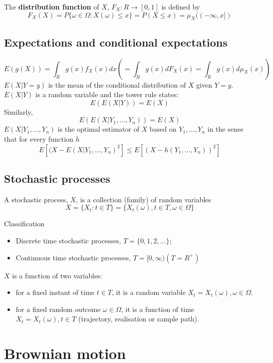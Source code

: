 \documentclass[11pt,a4paper]{book}
\theoremstyle{definition}\newtheorem{definition}{Definition}
\theoremstyle{definition}\newtheorem{fact}{Fact}
\theoremstyle{definition}\newtheorem{remark}{Remark}
\theoremstyle{definition}\newtheorem{ex}{Ex.}
\theoremstyle{definition}\newtheorem{project}{Project}
\theoremstyle{definition}\newtheorem{problem}{Problem}
\theoremstyle{definition}\newtheorem{example}{Example}
\numberwithin{theorem}{section}
\numberwithin{corollary}{chapter}
\numberwithin{assumption}{chapter}
\numberwithin{definition}{chapter}
\numberwithin{prop}{chapter}
\numberwithin{notation}{chapter}
\numberwithin{problem}{chapter}
\numberwithin{example}{chapter}
\numberwithin{fact}{chapter}
\numberwithin{ex}{chapter}
\begin{document}
The \textbf{distribution function} of $X$, $F_X : R \rightarrow [0,1]$ is defined by
$$ F_X(X) = P \{\omega \in \Omega : X(\omega) \leq x \} = P(X \leq x) = \mu_X((-\infty, x]) $$

\subsection{Expectations and conditional expectations}

$$E(g(X)) = \int_R g(x) f_X(x) dx  (= \int_R g(x) dF_X(x) = \int_R g(x) d\mu_X(x)) $$
$E(X | Y=y)$ is the mean of the conditional distribution of $X$ given $Y=y$.
$E(X | Y)$ is a random variable and the tower rule states:
$$E(E(X | Y)) = E(X)$$
Similarly,
$$E(E(X | Y_1,...,Y_n)) = E(X)$$
$E(X | Y_1,...,Y_n)$ is the optimal estimator of $X$ based on $Y_1,...,Y_n$ in the sense that for every function $h$
$$ E[ (X-E(X | Y_1,...,Y_n)^2 ] \leq E[ (X - h(Y_1,...,Y_n))^2 ] $$

\subsection{Stochastic processes}

A stochastic process, $X$, is a collection (family) of random variables
$$ X = \{X_t : t \in T \} = \{X_t(\omega), t \in T, \omega \in \Omega \} $$

Classification
\begin{itemize}
\item Discrete time stochastic processes, $T = \{0,1,2,...\}$;
\item Continuous time stochastic processes, $T = [0, \infty) (T = R^{+})$
\end{itemize}

$X$ is a function of two variables:
\begin{itemize}
\item for a fixed instant of time $t \in T$, it is a random variable $X_t = X_t(\omega), \omega \in \Omega$.
\item for a fixed random outcome $\omega \in \Omega$, it is a function of time $X_t = X_t(\omega), t \in T$ (trajectory, realisation or sample path).
\end{itemize}

\section{Brownian motion}
\end{document}
